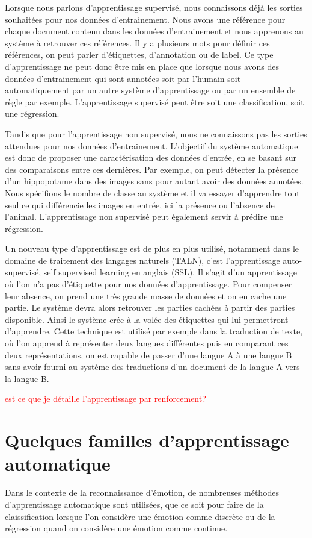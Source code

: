 Lorsque nous parlons d'apprentissage supervisé, nous connaissons déjà les sorties souhaitées pour nos données d'entrainement. Nous avons une référence pour chaque document contenu dans les données d'entrainement et nous apprenons au système à retrouver ces références.
Il y a plusieurs mots pour définir ces références, on peut parler d'étiquettes, d'annotation ou de label. Ce type d'apprentissage ne peut donc être mis en place que lorsque nous avons des données d'entrainement qui sont annotées soit par l'humain soit automatiquement par un autre système d'apprentissage ou par un ensemble de règle par exemple. L'apprentissage supervisé peut être soit une classification, soit une régression.

Tandis que pour l'apprentissage non supervisé, nous ne connaissons pas les sorties attendues pour nos données d'entrainement. L'objectif du système automatique est donc de proposer une caractérisation des données d'entrée, en se basant sur des comparaisons entre ces dernières. Par exemple, on peut détecter la présence d'un hippopotame dans des images sans pour autant avoir des données annotées. Nous spécifions le nombre de classe au système et il va essayer d'apprendre tout seul ce qui différencie les images en entrée, ici la présence ou l'absence de l'animal. L'apprentissage non supervisé peut également servir à prédire une régression.

Un nouveau type d'apprentissage est de plus en plus utilisé, notamment dans le domaine de traitement des langages naturels (TALN), c'est l'apprentissage auto-supervisé, self supervised learning en anglais (SSL). Il s'agit d'un apprentissage où l'on n'a pas d'étiquette pour nos données d'apprentissage. Pour compenser leur absence, on prend une très grande masse de données et on en cache une partie. Le système devra alors retrouver les parties cachées à partir des parties disponible. Ainsi le système crée à la volée des étiquettes qui lui permettront d'apprendre.
Cette technique est utilisé par exemple dans la traduction de texte, où l'on apprend à représenter deux langues différentes puis en comparant ces deux représentations, on est capable de passer d'une langue A à une langue B sans avoir fourni au système des traductions d'un document de la langue A vers la langue B.

\textcolor{red}{est ce que je détaille l'apprentissage par renforcement?}

\section{Quelques familles d'apprentissage automatique}
Dans le contexte de la reconnaissance d'émotion, de nombreuses méthodes d'apprentissage automatique sont utilisées, que ce soit pour faire de la claissification lorsque l'on considère une émotion comme discrète ou de la régression quand on considère une émotion comme continue.


